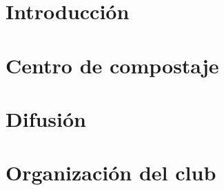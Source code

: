 \documentclass{ManualProyecto}
\begin{document}
    \frontmatter

\Portada
\Indices

    \mainmatter


\chapter{Introducción} 
\chapter{Centro de compostaje} 
\chapter{Difusión} 
\chapter{Organización del club} 
    

    \appendix



    \backmatter

\Bibliografia
\end{document}
